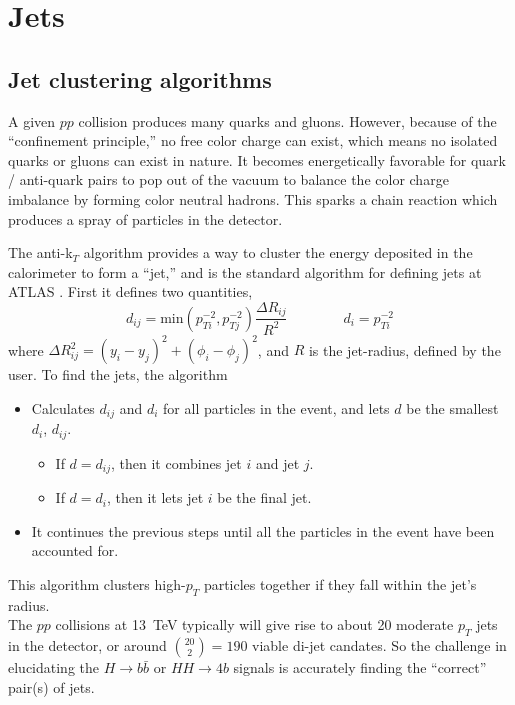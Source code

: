 \section{Jets}

\subsection{Jet clustering algorithms}

A given $pp$ collision produces many quarks and gluons.  However, because of the ``confinement principle,'' no free color charge can exist, which means no isolated quarks or gluons can exist in nature. %
It becomes energetically favorable for quark / anti-quark pairs to pop out of the vacuum to balance the color charge imbalance by forming color neutral hadrons. 
This sparks a chain reaction which produces a spray of particles in the detector. 

The anti-k$_T$ algorithm provides a way to cluster the energy deposited in the calorimeter to form a ``jet,'' and is the standard algorithm for defining jets at ATLAS \cite{antiKt}.  First it defines two quantities, 
%
\begin{equation}
d_{ij} = {\text{min}}( p_{Ti}^{-2}, p_{Tj}^{-2}) \frac{\Delta R_{ij}}{R^2} \qquad \qquad  d_i = p_{Ti}^{-2}
\end{equation}
%
where $\Delta R_{ij}^2 = (y_i - y_j)^2 + (\phi_i - \phi_j)^2$, and $R$ is the jet-radius, defined by the user.  To find the jets, the algorithm
%
\begin{itemize}
\item{Calculates $d_{ij}$ and $d_i$ for all particles in the event, and lets $d$ be the smallest $d_i$, $d_{ij}$.}
	\begin{itemize}
	\item{If $d = d_{ij}$, then it combines jet $i$ and jet $j$.}
	\item{If $d = d_{i}$, then it lets jet $i$ be the final jet.}
	\end{itemize}
\item{It continues the previous steps until all the particles in the event have been accounted for.}
\end{itemize}
%
This algorithm clusters high-$p_T$ particles together if they fall within the jet's radius. \\

The $pp$ collisions at 13~TeV typically will give rise to about 20 moderate $p_T$ jets in the detector, or around ${{20}\choose{2}} = 190$ viable di-jet candates.  So the challenge in elucidating the $H\rightarrow b\bar{b}$ or $HH \rightarrow 4b$ signals is accurately finding the ``correct'' pair(s) of jets.


